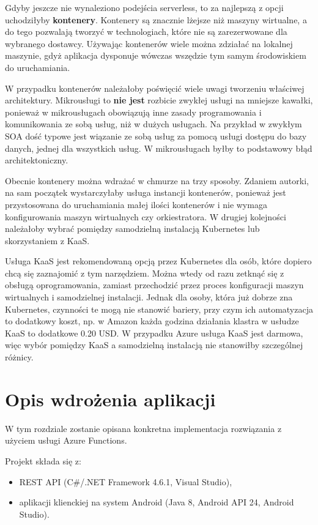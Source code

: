 \documentclass[12pt,a4paper,twoside,titlepage,openright]{book}
\begin{document}
Gdyby jeszcze nie wynaleziono podejścia serverless, to za najlepszą z opcji uchodziłyby \textbf{kontenery}. Kontenery są znacznie lżejsze niż maszyny wirtualne, a do tego pozwalają tworzyć w technologiach, które nie są zarezerwowane dla wybranego dostawcy. Używając kontenerów wiele można zdziałać na lokalnej maszynie, gdyż aplikacja dysponuje wówczas wszędzie tym samym środowiskiem do uruchamiania. 

W przypadku kontenerów należałoby poświęcić wiele uwagi tworzeniu właściwej architektury. Mikrousługi to \textbf{nie jest} rozbicie zwykłej usługi na mniejsze kawałki, ponieważ w mikrousługach obowiązują inne zasady programowania i komunikowania ze sobą usług, niż w dużych usługach. Na przykład w zwykłym SOA dość typowe jest wiązanie ze sobą usług za pomocą usługi dostępu do bazy danych, jednej dla wszystkich usług. W mikrousługach byłby to podstawowy błąd architektoniczny. 

Obecnie kontenery można wdrażać w chmurze na trzy sposoby. Zdaniem autorki, na sam początek wystarczyłaby usługa instancji kontenerów, ponieważ jest przystosowana do uruchamiania małej ilości kontenerów i nie wymaga konfigurowania maszyn wirtualnych czy orkiestratora. W drugiej kolejności należałoby wybrać pomiędzy samodzielną instalacją Kubernetes lub skorzystaniem z KaaS. 

Usługa KaaS jest rekomendowaną opcją przez Kubernetes dla osób, które dopiero chcą się zaznajomić z tym narzędziem. Można wtedy od razu zetknąć się z obsługą oprogramowania, zamiast przechodzić przez proces konfiguracji maszyn wirtualnych i samodzielnej instalacji. Jednak dla osoby, która już dobrze zna Kubernetes, czynności te mogą nie stanowić bariery, przy czym ich automatyzacja to dodatkowy koszt, np. w Amazon każda godzina działania klastra w usłudze KaaS to dodatkowe 0.20 USD. W przypadku Azure usługa KaaS jest darmowa, więc wybór pomiędzy KaaS a samodzielną instalacją nie stanowiłby szczególnej różnicy.



\chapter{Opis wdrożenia aplikacji}

W tym rozdziale zostanie opisana konkretna implementacja rozwiązania z użyciem usługi Azure Functions.

Projekt składa się z:
\begin{itemize}
\item REST API (C\#/.NET Framework 4.6.1, Visual Studio),
\item aplikacji klienckiej na system Android (Java 8, Android API 24, Android Studio).
\end{itemize}
\end{document}
